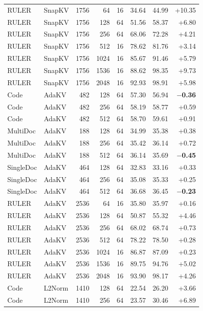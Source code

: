 \begin{table}[t]
\begin{tabular}{@{}l l r r r r r r@{}}
    RULER & SnapKV & 1756 & 64 & 16 & 34.64 & 44.99 & +10.35 \\
    RULER & SnapKV & 1756 & 128 & 64 & 51.56 & 58.37 & +6.80 \\
    RULER & SnapKV & 1756 & 256 & 64 & 68.06 & 72.28 & +4.21 \\
    RULER & SnapKV & 1756 & 512 & 16 & 78.62 & 81.76 & +3.14 \\
    RULER & SnapKV & 1756 & 1024 & 16 & 85.67 & 91.46 & +5.79 \\
    RULER & SnapKV & 1756 & 1536 & 16 & 88.62 & 98.35 & +9.73 \\
    RULER & SnapKV & 1756 & 2048 & 16 & 92.93 & 98.91 & +5.98 \\
    Code & AdaKV & 482 & 128 & 64 & 57.30 & 56.94 & \textbf{$-$0.36} \\
    Code & AdaKV & 482 & 256 & 64 & 58.19 & 58.77 & +0.59 \\
    Code & AdaKV & 482 & 512 & 64 & 58.70 & 59.61 & +0.91 \\
    MultiDoc & AdaKV & 188 & 128 & 64 & 34.99 & 35.38 & +0.38 \\
    MultiDoc & AdaKV & 188 & 256 & 64 & 35.42 & 36.14 & +0.72 \\
    MultiDoc & AdaKV & 188 & 512 & 64 & 36.14 & 35.69 & \textbf{$-$0.45} \\
    SingleDoc & AdaKV & 464 & 128 & 64 & 32.83 & 33.16 & +0.33 \\
    SingleDoc & AdaKV & 464 & 256 & 64 & 35.08 & 35.33 & +0.25 \\
    SingleDoc & AdaKV & 464 & 512 & 64 & 36.68 & 36.45 & \textbf{$-$0.23} \\
    RULER & AdaKV & 2536 & 64 & 16 & 35.80 & 35.97 & +0.16 \\
    RULER & AdaKV & 2536 & 128 & 64 & 50.87 & 55.32 & +4.46 \\
    RULER & AdaKV & 2536 & 256 & 64 & 68.02 & 68.74 & +0.73 \\
    RULER & AdaKV & 2536 & 512 & 64 & 78.22 & 78.50 & +0.28 \\
    RULER & AdaKV & 2536 & 1024 & 16 & 86.87 & 87.09 & +0.23 \\
    RULER & AdaKV & 2536 & 1536 & 16 & 89.75 & 94.76 & +5.02 \\
    RULER & AdaKV & 2536 & 2048 & 16 & 93.90 & 98.17 & +4.26 \\
    Code & L2Norm & 1410 & 128 & 64 & 22.54 & 26.20 & +3.66 \\
    Code & L2Norm & 1410 & 256 & 64 & 23.57 & 30.46 & +6.89 \\

\end{tabular}
\end{table}
